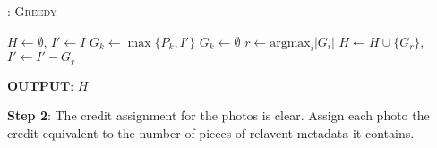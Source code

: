 \begin{algorithm}[H]
\caption{: \textsc{Greedy}}
\label{alg:greedy} 
\begin{small}
\begin{algorithmic}[1]
\STATE $H\leftarrow \emptyset$, $I'\leftarrow I$
   			\STATE $G_k\leftarrow \max\{P_k,I'\}$
   		\ELSE
   			\STATE $G_k\leftarrow \emptyset$
   		\ENDIF
   	\ENDFOR
	\STATE $r\leftarrow\text{argmax}_i |G_i|$
	\STATE $H\leftarrow H\cup\{G_r\}$, $I'\leftarrow I'-G_r$ 
\ENDWHILE
\end{algorithmic}
\end{small}
$\textbf{OUTPUT}$: $H$
\end{algorithm}

\textbf{Step 2}:  The credit assignment for the photos is clear.  Assign each photo the credit equivalent to the number of pieces of relavent metadata it contains.

